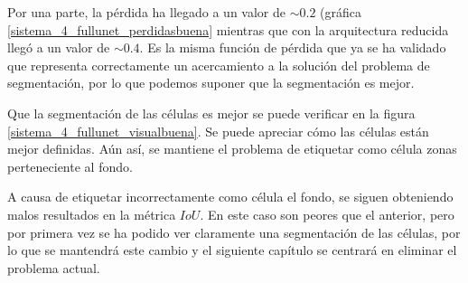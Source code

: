 


Por una parte, la pérdida ha llegado a un valor de $\sim 0.2$ (gráfica \ref{sistema_4_fullunet_perdidasbuena} mientras que con la arquitectura reducida  llegó a un valor de $\sim 0.4$. Es la misma función de pérdida que ya se ha validado que representa correctamente un acercamiento a la solución del problema de segmentación, por lo que podemos suponer que la segmentación es mejor.

Que la segmentación de las células es mejor se puede verificar en la figura \ref{sistema_4_fullunet_visualbuena}. Se puede apreciar cómo las células están mejor definidas. Aún así, se mantiene el problema de etiquetar como célula zonas perteneciente al fondo.

A causa de etiquetar incorrectamente como célula el fondo, se siguen obteniendo malos resultados en la métrica $IoU$. En este caso son peores que el anterior, pero por primera vez se ha podido ver claramente una segmentación de las células, por lo que se mantendrá este cambio y el siguiente capítulo se centrará en eliminar el problema actual.